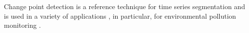
Change point detection is a reference technique for time series segmentation and is used in a variety of applications \citep{basseville1993detection, chen2012parametric, liu2017change, reeves2007review, levy2009detection}, in particular, for environmental pollution monitoring \citep{costa2016}. 

